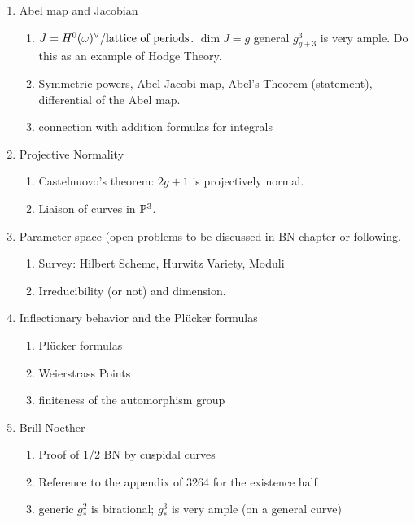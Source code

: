 \documentclass[12pt, leqno]{article}
\begin{document}
\begin{enumerate}
\item Abel map and Jacobian
\begin{enumerate}
\item $J = H^0(\omega)^\vee/\hbox{lattice of periods}$. $\dim J = g$ general $g^3_{g+3}$ is very ample. Do this as an example of Hodge Theory.

\item Symmetric powers, Abel-Jacobi map, Abel's Theorem (statement), differential of the Abel map.
\item connection with addition formulas for integrals
\end{enumerate}

\item Projective Normality
\begin{enumerate}
\item Castelnuovo's theorem: $2g+1$ is projectively normal.
\item Liaison of curves in ${\mathbb P}^3$.
 \end{enumerate}

\item Parameter space (open problems to be discussed in BN chapter or following.
\begin{enumerate}
\item Survey: Hilbert Scheme, Hurwitz Variety, Moduli
\item Irreducibility (or not) and dimension. 
\end{enumerate}

\item Inflectionary behavior and the Pl\"ucker formulas
\begin{enumerate}
 \item Pl\"ucker formulas
 \item Weierstrass Points
 \item finiteness of the automorphism group
\end{enumerate}

\item Brill Noether
\begin{enumerate}

\item Proof of 1/2 BN by cuspidal curves
\item Reference to the appendix of 3264 for the existence half
\item generic $g^2_*$ is birational; $g^3_*$ is very ample (on a general curve)
\end{enumerate}







\end{enumerate}
\end{document}
